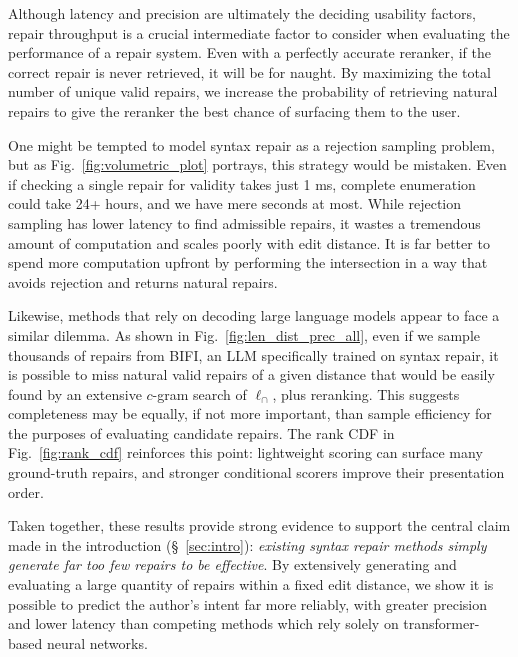 \documentclass[popl.tex]{subfiles}
\begin{document}
Although latency and precision are ultimately the deciding usability factors, repair throughput is a crucial intermediate factor to consider when evaluating the performance of a repair system. Even with a perfectly accurate reranker, if the correct repair is never retrieved, it will be for naught. By maximizing the total number of unique valid repairs, we increase the probability of retrieving natural repairs to give the reranker the best chance of surfacing them to the user.

One might be tempted to model syntax repair as a rejection sampling problem, but as Fig.~\ref{fig:volumetric_plot} portrays, this strategy would be mistaken. Even if checking a single repair for validity takes just 1 ms, complete enumeration could take 24+ hours, and we have mere seconds at most. While rejection sampling has lower latency to find admissible repairs, it wastes a tremendous amount of computation and scales poorly with edit distance. It is far better to spend more computation upfront by performing the intersection in a way that avoids rejection and returns natural repairs.

Likewise, methods that rely on decoding large language models appear to face a similar dilemma. As shown in Fig.~\ref{fig:len_dist_prec_all}, even if we sample thousands of repairs from BIFI, an LLM specifically trained on syntax repair, it is possible to miss natural valid repairs of a given distance that would be easily found by an extensive $c$-gram search of $\ell_\cap$, plus reranking. This suggests completeness may be equally, if not more important, than sample efficiency for the purposes of evaluating candidate repairs. The rank CDF in Fig.~\ref{fig:rank_cdf} reinforces this point: lightweight scoring can surface many ground-truth repairs, and stronger conditional scorers improve their presentation order.

Taken together, these results provide strong evidence to support the central claim made in the introduction (\S~\ref{sec:intro}): \textit{existing syntax repair methods simply generate far too few repairs to be effective}. By extensively generating and evaluating a large quantity of repairs within a fixed edit distance, we show it is possible to predict the author's intent far more reliably, with greater precision and lower latency than competing methods which rely solely on transformer-based neural networks.%
\end{document}
